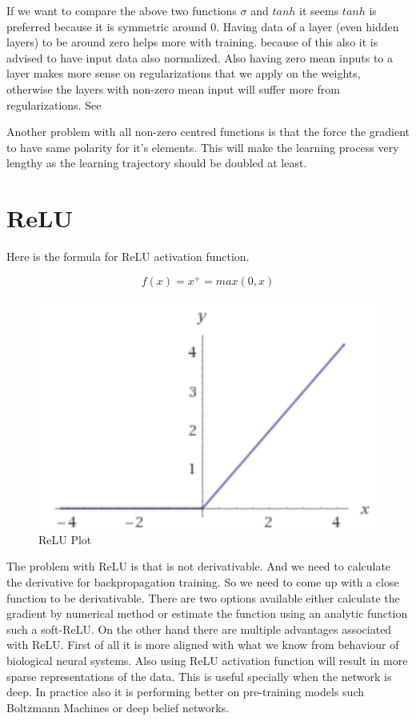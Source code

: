 If we want to compare the above two functions $\sigma$ and $tanh$ it seems $tanh$ is preferred because it is symmetric around 0. Having data of a layer (even hidden layers) to be around zero helps more with training. because of this  also it is advised to have input data also normalized. Also having  zero mean inputs to a layer makes more sense on regularizations that we apply on the weights, otherwise the layers with non-zero mean input will suffer more from regularizations. See \cite{LeCun:1998:EB:645754.668382}

Another problem with all non-zero centred functions is that the force the gradient to have same polarity for it's elements. This will make the learning process very lengthy as the learning trajectory should be doubled at least. 

\section{ReLU}
Here is the formula for ReLU activation function. 

\begin{equation}
    f(x) = x^{+} = max(0, x)
\end{equation}

\begin{figure}[!htb]
    \centering
    \includegraphics[scale=0.3]{images/ReLU.jpg}
    \caption{ReLU Plot}
\end{figure}

The problem with ReLU is that is not derivativable. And we need to calculate the derivative for backpropagation training. So we need to come up with a close function to be derivativable. There are two options available either calculate the gradient by numerical method or estimate the function using an analytic function such a soft-ReLU. 
On the other hand there are multiple advantages associated with ReLU.  First of all it is more aligned with what we know from behaviour of biological neural systems. Also using ReLU activation function will result in  more sparse representations of the data. This is useful specially when the network is deep. In practice also it is performing better on pre-training models such Boltzmann Machines or deep belief networks. 

